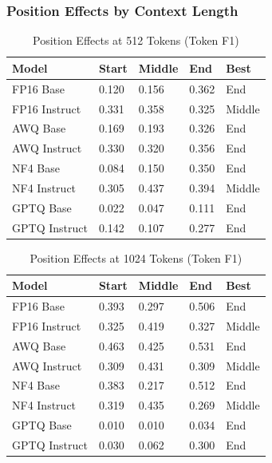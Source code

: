 \documentclass[11pt,a4paper]{article}
\begin{document}
\subsubsection{Position Effects by Context Length}

\begin{table}[H]
\centering
\caption{Position Effects at 512 Tokens (Token F1)}
\small
\begin{tabularx}{\textwidth}{@{}X C{2cm} C{2cm} C{2cm} C{2cm}@{}}
\toprule
\textbf{Model} & \textbf{Start} & \textbf{Middle} & \textbf{End} & \textbf{Best} \\
\midrule
FP16 Base & 0.120 & 0.156 & 0.362 & End \\
FP16 Instruct & 0.331 & 0.358 & 0.325 & Middle \\
AWQ Base & 0.169 & 0.193 & 0.326 & End \\
AWQ Instruct & 0.330 & 0.320 & 0.356 & End \\
NF4 Base & 0.084 & 0.150 & 0.350 & End \\
NF4 Instruct & 0.305 & 0.437 & 0.394 & Middle \\
GPTQ Base & 0.022 & 0.047 & 0.111 & End \\
GPTQ Instruct & 0.142 & 0.107 & 0.277 & End \\
\bottomrule
\end{tabularx}
\end{table}

\begin{table}[H]
\centering
\caption{Position Effects at 1024 Tokens (Token F1)}
\small
\begin{tabularx}{\textwidth}{@{}X C{2cm} C{2cm} C{2cm} C{2cm}@{}}
\toprule
\textbf{Model} & \textbf{Start} & \textbf{Middle} & \textbf{End} & \textbf{Best} \\
\midrule
FP16 Base & 0.393 & 0.297 & 0.506 & End \\
FP16 Instruct & 0.325 & 0.419 & 0.327 & Middle \\
AWQ Base & 0.463 & 0.425 & 0.531 & End \\
AWQ Instruct & 0.309 & 0.431 & 0.309 & Middle \\
NF4 Base & 0.383 & 0.217 & 0.512 & End \\
NF4 Instruct & 0.319 & 0.435 & 0.269 & Middle \\
GPTQ Base & 0.010 & 0.010 & 0.034 & End \\
GPTQ Instruct & 0.030 & 0.062 & 0.300 & End \\
\bottomrule
\end{tabularx}
\end{table}
\end{document}
